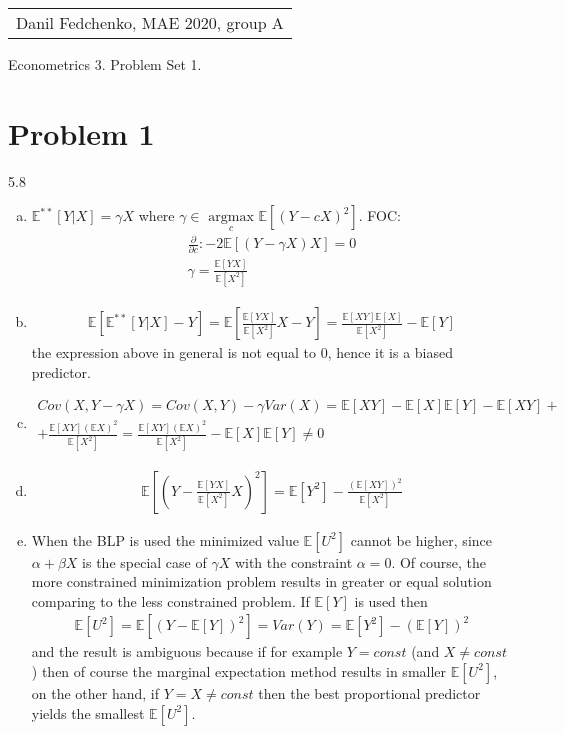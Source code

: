 \documentclass[a4paper]{article}
\newcommand{\expect}{\mathbb{E}}
\begin{document}
	\begin{flushright}
		\begin{tabular}{r}
			Danil Fedchenko, MAE 2020, group A \\
		\end{tabular}
	\end{flushright}
	
	
	\begin{center}
		Econometrics 3. Problem Set 1.
	\end{center}
	\section*{Problem 1}
	5.8
	\begin{enumerate}[(a)]
		\item $\expect^{**}[Y|X] = \gamma X$ where $\gamma \in \underset{c}{\text{ argmax }} \expect[(Y - cX)^2]$. FOC:
		\begin{align*}
		\frac{\partial }{\partial c}: -2 \expect[(Y - \gamma X)X] = 0\\
		\gamma = \frac{\expect[YX]}{\expect[X^2]}
		\end{align*}
		\item 
		\begin{align*}
		\expect[\expect^{**}[Y|X] - Y] = \expect\left[\frac{\expect[YX]}{\expect[X^2]}X - Y\right] = \frac{\expect[XY]\expect[X]}{\expect[X^2]} - \expect[Y]
		\end{align*}
		the expression above in general is not equal to 0, hence it is a biased predictor.
		\item \begin{align*}
		Cov(X, Y - \gamma X) = Cov(X, Y) - \gamma Var(X) = \expect[XY] - \expect[X]\expect[Y] - \expect[XY] +\\+ \frac{\expect[XY](\expect X)^2}{\expect[X^2]} = \frac{\expect[XY](\expect X)^2}{\expect[X^2]} - \expect[X]\expect[Y] \neq 0
		\end{align*}
		\item \begin{align*}
		\expect\left[(Y - \frac{\expect[YX]}{\expect[X^2]}X)^2\right] = \expect[Y^2] - \frac{(\expect[XY])^2}{\expect[X^2]}
		\end{align*}
		\item When the BLP is used the minimized value $\expect[U^2]$ cannot be higher, since $\alpha + \beta X$ is the special case of $\gamma X$ with the constraint $\alpha = 0$. Of course, the more constrained minimization problem results in greater or equal solution comparing to the less constrained problem. If $\expect[Y]$ is used then
		\begin{align*}
		\expect[U^2] = \expect[(Y - \expect[Y])^2] = Var(Y) = \expect[Y^2] - (\expect[Y])^2
		\end{align*}
		and the result is ambiguous because if for example $Y = const$ (and $X \neq const$) then of course the marginal expectation method results in smaller $\expect[U^2]$, on the other hand, if $Y = X \neq const$ then the best proportional predictor yields the smallest $\expect[U^2]$.  
	\end{enumerate}
\end{document}
